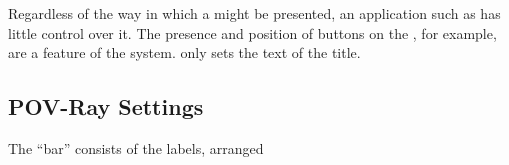 		Regardless of the way in which a 
		might be presented, an application such as \IXpkg{}
		has little control over it. The presence and position
		of buttons on the , for example,
		are a feature of the system. \IXpkgu{} only sets
		the text of the title.

		\subsection{POV-Ray Settings}%
		\label{ssec:prefs_povray}
		The  ``bar'' consists of the labels, arranged
